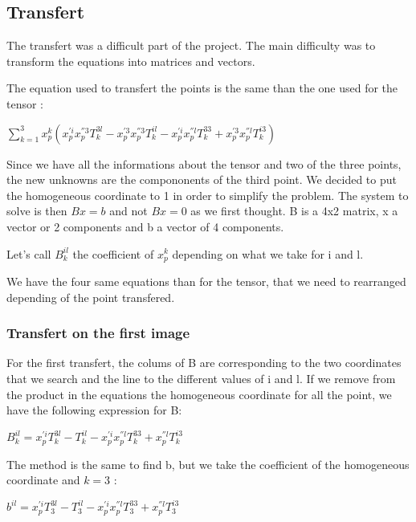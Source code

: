 \documentclass{report}
\begin{document}
\subsection{Transfert}
The transfert was a difficult part of the project. The main difficulty was to transform the equations into matrices and vectors.

The equation used to transfert the points is the same than the one used for the tensor : 
\begin{center}
 $ \displaystyle { \sum_{k = 1}^{3}} x_{p}^{k}(x_{p}^{'i}x_{p}^{''3}T_{k}^{3l} - x_{p}^{'3}x_{p}^{''3}T_{k}^{il} - x_{p}^{'i}x_{p}^{''l}T_{k}^{33} + x_{p}^{'3}x_{p}^{''l}T_{k}^{i3})$ 
\end{center}

Since we have all the informations about the tensor and two of the three points, the new unknowns are the compononents of the third point. We decided to put the homogeneous coordinate to 1 in order to simplify the problem. The system to solve is then $Bx=b$ and not $Bx=0$ as we first thought. B is a 4x2 matrix, x a vector or 2 components and b a vector of 4 components. 

Let's call $B_{k}^{il}$ the coefficient of $x_{p}^{k}$ depending on what we take for i and l. 

We have the four same equations than for the tensor, that we need to rearranged depending of the point transfered.


\subsubsection{Transfert on the first image}
For the first transfert, the colums of B are corresponding to the two coordinates that we search and the line to the different values of i and l. If we remove from the product in the equations the homogeneous coordinate for all the point, we have the following expression for B:

\begin{center}
$B_{k}^{il} = x_{p}^{'i}T_{k}^{3l} - T_{k}^{il} - x_{p}^{'i}x_{p}^{''l}T_{k}^{33} + x_{p}^{''l}T_{k}^{i3}$
\end{center}

The method is the same to find b, but we take the coefficient of the homogeneous coordinate and $k=3$ : 

\begin{center}
$b^{il} = x_{p}^{'i}T_{3}^{3l} - T_{3}^{il} - x_{p}^{'i}x_{p}^{''l}T_{3}^{33} + x_{p}^{''l}T_{3}^{i3}$
\end{center}
\end{document}

